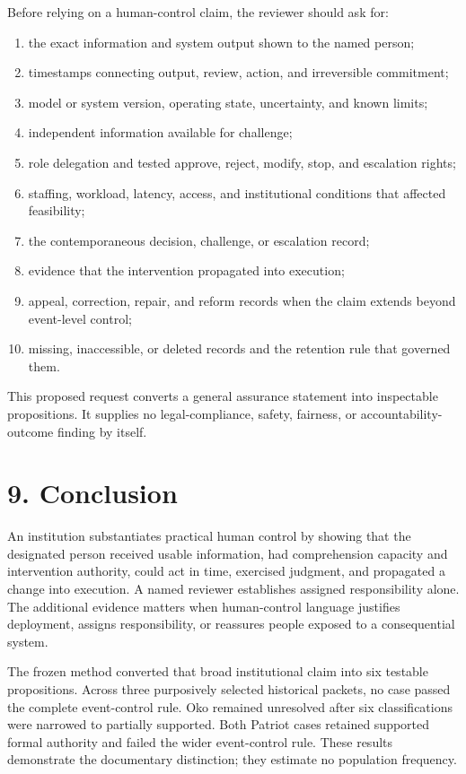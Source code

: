 \documentclass[11pt]{article}
\begin{document}
Before relying on a human-control claim, the reviewer should ask for:
\begin{enumerate}[leftmargin=*]
\item the exact information and system output shown to the named person;
\item timestamps connecting output, review, action, and irreversible commitment;
\item model or system version, operating state, uncertainty, and known limits;
\item independent information available for challenge;
\item role delegation and tested approve, reject, modify, stop, and escalation rights;
\item staffing, workload, latency, access, and institutional conditions that affected feasibility;
\item the contemporaneous decision, challenge, or escalation record;
\item evidence that the intervention propagated into execution;
\item appeal, correction, repair, and reform records when the claim extends beyond event-level control;
\item missing, inaccessible, or deleted records and the retention rule that governed them.
\end{enumerate}
This proposed request converts a general assurance statement into inspectable propositions. It supplies no legal-compliance, safety, fairness, or accountability-outcome finding by itself.
\FloatBarrier
\section*{9. Conclusion}
An institution substantiates practical human control by showing that the designated person received usable information, had comprehension capacity and intervention authority, could act in time, exercised judgment, and propagated a change into execution. A named reviewer establishes assigned responsibility alone. The additional evidence matters when human-control language justifies deployment, assigns responsibility, or reassures people exposed to a consequential system.

The frozen method converted that broad institutional claim into six testable propositions. Across three purposively selected historical packets, no case passed the complete event-control rule. Oko remained unresolved after six classifications were narrowed to partially supported. Both Patriot cases retained supported formal authority and failed the wider event-control rule. These results demonstrate the documentary distinction; they estimate no population frequency.
\end{document}
